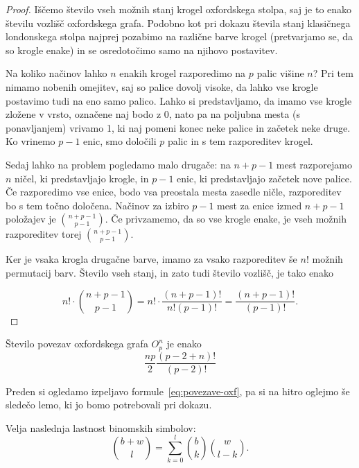 \documentclass[twoside,11pt]{article}
\begin{document}
\begin{proof}
Iščemo število vseh možnih stanj krogel oxfordskega stolpa, saj je to enako številu vozlišč oxfordskega grafa.
Podobno kot pri dokazu števila stanj klasičnega londonskega stolpa najprej pozabimo na različne barve krogel (pretvarjamo se, da so krogle enake) in se osredotočimo samo na njihovo postavitev. 

Na koliko načinov lahko $n$ enakih krogel razporedimo na $p$ palic višine $n$? Pri tem nimamo nobenih omejitev, saj so palice dovolj visoke, da lahko vse krogle postavimo tudi na eno samo palico. Lahko si predstavljamo, da imamo vse krogle zložene v vrsto, označene naj bodo z 0, nato pa na poljubna mesta (s ponavljanjem) vrivamo 1, ki naj pomeni konec neke palice in začetek neke druge. Ko vrinemo $p-1$ enic, smo določili $p$ palic in s tem razporeditev krogel. 

Sedaj lahko na problem pogledamo malo drugače: na $n+p-1$ mest razporejamo $n$ ničel, ki predstavljajo krogle, in $p-1$ enic, ki predstavljajo začetek nove palice. Če razporedimo vse enice, bodo vsa preostala mesta zasedle ničle, razporeditev bo s tem točno določena. Načinov za izbiro $p-1$ mest za enice izmed $n+p-1$ položajev je ${n+p-1 \choose p-1}$. Če privzamemo, da so vse krogle enake, je vseh možnih razporeditev torej ${n+p-1 \choose p-1}$.

Ker je vsaka krogla drugačne barve, imamo za vsako razporeditev še $n!$ možnih permutacij barv. Število vseh stanj, in zato tudi število vozlišč, je tako enako

\[ n! \cdot {n+p-1 \choose p-1} = n! \cdot \frac{(n+p-1)!}{n!(p-1)!} = \frac{(n+p-1)!}{(p-1)!}. \] \qedhere
\end{proof}

\begin{trditev}
    Število povezav oxfordskega grafa $O^n_p$ je enako
    \begin{equation}
    \label{eq:povezave-oxf}
    \frac{np}{2} \frac{(p-2+n)!}{(p-2)!}
    \end{equation}
    \label{trd:povezave-oxf}
\end{trditev}

Preden si ogledamo izpeljavo formule~\eqref{eq:povezave-oxf}, pa si na hitro oglejmo še sledečo lemo, ki jo bomo potrebovali pri dokazu.

\begin{lema}
    Velja naslednja lastnost binomskih simbolov:
    \begin{equation}
    \label{eq:binom}
    {b+w \choose l} = \sum_{k=0}^{l}{b \choose k}{w \choose l-k}.
    \end{equation}
\end{lema}
\end{document}
